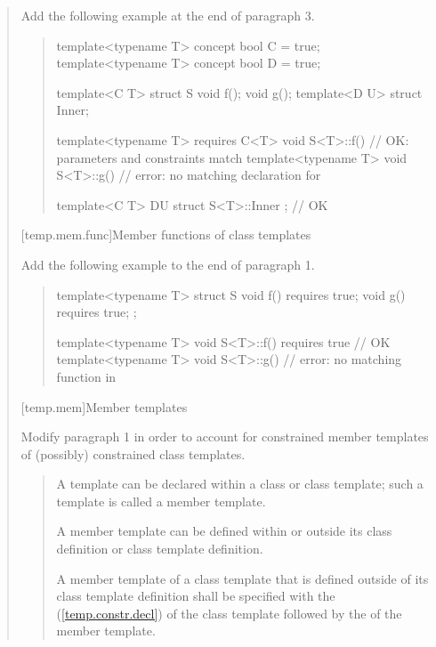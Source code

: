 \begin{quote}
Add the following example at the end of paragraph 3.

\begin{quote}
\begin{addedblock}
\enterexample
\begin{codeblock}
template<typename T> concept bool C = true;
template<typename T> concept bool D = true;

template<C T> struct S {
    void f();
    void g();
    template<D U> struct Inner;
  }

template<typename T> requires C<T> void S<T>::f() { } // OK: parameters and constraints match
template<typename T> void S<T>::g() { } // error: no matching declaration for 

template<C T> D{U} struct S<T>::Inner { }; // OK
\end{codeblock}
\exitexample
\end{addedblock}
\end{quote}

[temp.mem.func]{Member functions of class templates}

Add the following example to the end of paragraph 1.

\begin{quote}
\begin{addedblock}
\enterexample
\begin{codeblock}
template<typename T> struct S {
  void f() requires true;
  void g() requires true;
};

template<typename T> 
  void S<T>::f() requires true { } // OK
template<typename T> 
  void S<T>::g() { }               // error: no matching function in 
\end{codeblock}
\exitexample
\end{addedblock}
\end{quote}


[temp.mem]{Member templates}


Modify paragraph 1 in order to account for constrained member templates
of (possibly) constrained class templates. 

\begin{quote}
A template can be declared within a class or class template; such a 
template is called a member template. 

A member template can be defined within or outside its class definition 
or class template definition. 

A member template of a class template that is defined outside of its 
class template definition shall be specified with the 
 
(\ref{temp.constr.decl}) of the class template followed by the 
 of the member template.
\end{quote}



\end{quote}
